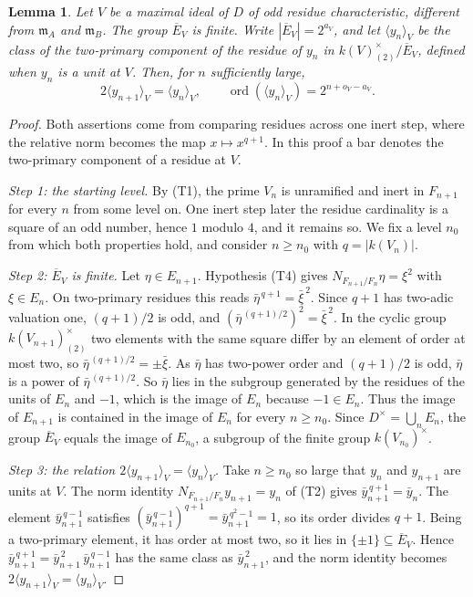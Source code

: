 \documentclass[11pt]{article}
\theoremstyle{plain}
\newtheorem{lemma}[theorem]{Lemma}
\theoremstyle{definition}
\theoremstyle{remark}
\DeclareMathOperator{\ord}{ord}
\newcommand{\EA}{\mathfrak m_A}
\newcommand{\EB}{\mathfrak m_B}
\begin{document}
\begin{lemma}\label{lem:unitresidues}
Let $V$ be a maximal ideal of $D$ of odd residue characteristic,
different from $\EA$ and $\EB$.  The group $\overline E_V$ is finite.
Write $|\overline E_V|=2^{a_V}$, and let $\langle y_n\rangle_V$ be the class of the
two-primary component of the residue of $y_n$ in
$k(V)^\times_{(2)}/\overline E_V$, defined when $y_n$ is a unit at $V$.
Then, for $n$ sufficiently large,
\[
 2\langle y_{n+1}\rangle_V=\langle y_n\rangle_V,\qquad \ord(\langle y_n\rangle_V)=2^{n+o_V-a_V}.
\]
\end{lemma}
\begin{proof}
Both assertions come from comparing residues across one inert step, where
the relative norm becomes the map $x\mapsto x^{q+1}$.  In this proof a bar
denotes the two-primary component of a residue at $V$.

\emph{Step 1: the starting level.}  By (T1), the prime $V_n$ is
unramified and inert in $F_{n+1}$ for every $n$ from some level on.  One
inert step later the residue cardinality is a square of an odd number,
hence $1$ modulo $4$, and it remains so.  We fix a level $n_0$ from which
both properties hold, and consider $n\geq n_0$ with $q=|k(V_n)|$.

\emph{Step 2: $\overline E_V$ is finite.}  Let $\eta\in E_{n+1}$.
Hypothesis (T4) gives $N_{F_{n+1}/F_n}\eta=\xi^2$ with $\xi\in E_n$.  On
two-primary residues this reads $\bar\eta^{\,q+1}=\bar\xi^{\,2}$.  Since
$q+1$ has two-adic valuation one, $(q+1)/2$ is odd, and
$(\bar\eta^{\,(q+1)/2})^2=\bar\xi^{\,2}$.  In the cyclic group
$k(V_{n+1})^\times_{(2)}$ two elements with the same square differ by an
element of order at most two, so $\bar\eta^{\,(q+1)/2}=\pm\bar\xi$.  As
$\bar\eta$ has two-power order and $(q+1)/2$ is odd, $\bar\eta$ is a power
of $\bar\eta^{\,(q+1)/2}$.  So $\bar\eta$ lies in the subgroup generated by
the residues of the units of $E_n$ and $-1$, which is the image of $E_n$
because $-1\in E_n$.  Thus the image of $E_{n+1}$ is contained in the
image of $E_n$ for every $n\geq n_0$.  Since $D^\times=\bigcup_nE_n$, the
group $\overline E_V$ equals the image of $E_{n_0}$, a subgroup of the
finite group $k(V_{n_0})^\times$.

\emph{Step 3: the relation $2\langle y_{n+1}\rangle_V=\langle y_n\rangle_V$.}  Take $n\geq n_0$ so
large that $y_n$ and $y_{n+1}$ are units at $V$.  The norm identity
$N_{F_{n+1}/F_n}y_{n+1}=y_n$ of (T2) gives
$\bar y_{n+1}^{\,q+1}=\bar y_n$.  The element $\bar y_{n+1}^{\,q-1}$
satisfies $(\bar y_{n+1}^{\,q-1})^{q+1}=\bar y_{n+1}^{\,q^2-1}=1$, so its
order divides $q+1$.  Being a two-primary element, it has order at most
two, so it lies in $\{\pm1\}\subseteq\overline E_V$.  Hence
$\bar y_{n+1}^{\,q+1}=\bar y_{n+1}^{\,2}\,\bar y_{n+1}^{\,q-1}$ has the
same class as $\bar y_{n+1}^{\,2}$, and the norm identity becomes
$2\langle y_{n+1}\rangle_V=\langle y_n\rangle_V$.


\end{proof}
\end{document}
